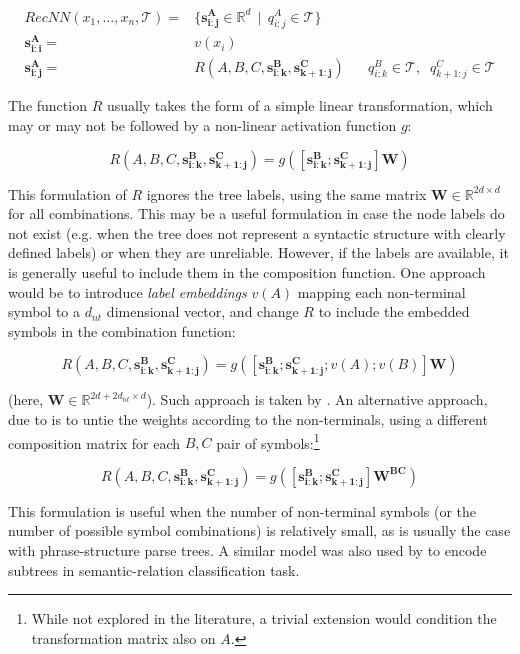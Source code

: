 \documentclass[jair,twoside,11pt,theapa]{article}
\newcommand{\m}[1]{\mathbf{#1}}%
\begin{document}
{\begin{align*}
    RecNN(x_1,\ldots,x_n,\mathcal{T}) =& \{ \m{s^A_{i:j}} \in \mathbb{R}^d \,\mid\, q^A_{i:j} \in \mathcal{T} \} \\
    \m{s^A_{i:i}} =& v(x_i) \\
    \m{s^A_{i:j}} =& R(A, B, C, \m{s^B_{i:k}}, \m{s^C_{k+1:j}})  \;\;\;\;\;\; q^B_{i:k}\in \mathcal{T}, \;\; q^C_{k+1:j} \in \mathcal{T} 
\end{align*}

The function $R$ usually takes the form of a simple linear
transformation, which may or may not be followed by a non-linear activation
function $g$:

\[
R(A, B, C, \m{s^B_{i:k}}, \m{s^C_{k+1:j}}) = g([\m{s^B_{i:k}} ; \m{s^C_{k+1:j}}]\m{W})
\]

\noindent This formulation of $R$ ignores the tree labels, using the same matrix $\m{W}
\in \mathbb{R}^{2d\times d}$ for all combinations.  This may be a useful
formulation in case the node labels do not exist (e.g. when the tree does not
represent a syntactic structure with clearly defined labels) or when they are
unreliable.  However, if the labels are available, it is generally useful to
include them in the composition function.  One approach would be to introduce
\emph{label embeddings} $v(A)$ mapping each non-terminal symbol to a $d_{nt}$
dimensional vector, and change $R$ to include the embedded symbols in the
combination function:

\[
R(A, B, C, \m{s^B_{i:k}}, \m{s^C_{k+1:j}}) = g([\m{s^B_{i:k}} ; \m{s^C_{k+1:j}} ; v(A); v(B)]\m{W})
\]

\noindent (here, $\m{W} \in \mathbb{R}^{2d+2d_{nt} \times d}$). Such approach is
taken by \cite{qian2015learning}.
An alternative approach, due to \cite{socher2013parsing} is to untie the weights
according to the non-terminals, using a different composition matrix for each
$B,C$ pair of symbols:\footnote{While not explored in the literature, a trivial
extension would condition the transformation matrix also on $A$.}

\[
R(A, B, C, \m{s^B_{i:k}}, \m{s^C_{k+1:j}}) = g([\m{s^B_{i:k}} ; \m{s^C_{k+1:j}}]\m{W^{BC}})
\]

\noindent This formulation is useful when the number of non-terminal symbols (or
the number of possible symbol combinations) is relatively small, as is usually
the case with phrase-structure parse trees.  A similar model was also used by
\cite{hashimoto2013simple} to encode subtrees in semantic-relation
classification task.


}
\end{document}

